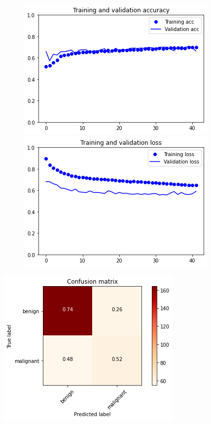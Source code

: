 \documentclass{article}
\begin{document}
\begin{figure}[h]
    \centering
    \begin{minipage}{0.45\textwidth}
        \centering
        \includegraphics[scale=0.46]{./img/preTrainValVGG19_ft_3_2.png}
    \end{minipage}\hfill
    \begin{minipage}{0.45\textwidth}
        \centering
        \includegraphics[scale=0.46]{./img/preTrainLossVGG19_ft_3_2.png}
    \end{minipage}
\end{figure}

\begin{center}
\begin{minipage}{0.45\textwidth}
        \includegraphics[scale=0.6]{./img/cmPreTrainVGG19_ft_3_2.png}
    \end{minipage}
\end{center}
\end{document}
